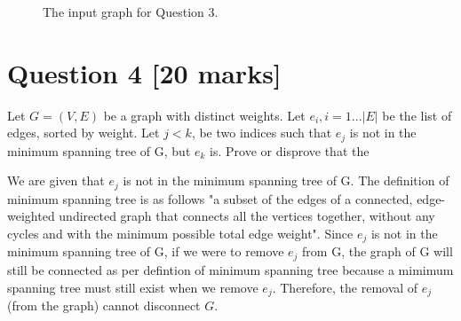 \documentclass[11pt]{article}
\begin{document}
\begin{figure}[t]
	\centerline{}
	\caption{The input graph for Question 3.}
	\label{fig:MSTgraph}
\end{figure}

\section*{Question 4 [20 marks]}
 Let $G= (V,E)$ be a graph with distinct weights.
 Let $e_{i}, i=1...|E|$ be the list of edges, sorted by weight. Let $j < k$, be two indices such that $e_j$ is not in the minimum spanning tree of G, but $e_k$ is. Prove or disprove that  the  

 We are given that $e_j$ is not in the minimum spanning tree of G. 
 The definition of minimum spanning tree is as follows "a subset of the edges of a connected, edge-weighted undirected graph that connects all the vertices together, without any cycles and with the minimum possible total edge weight".
 Since $e_j$ is not in the minimum spanning tree of G, if we were to remove $e_j$ from G, the graph of G will still be connected as per defintion of minimum spanning tree because a mimimum spanning tree must still exist when we remove $e_j$.
 Therefore, the removal of $e_{j}$ (from the graph) cannot disconnect $G$.


\end{document}

